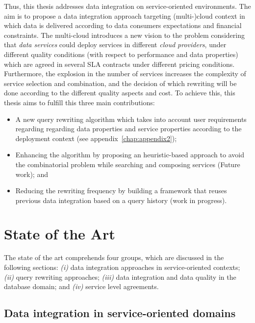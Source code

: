 \bigskip
\noindent Thus, this thesis addresses data integration on service-oriented environments.
%
The aim is to propose a data integration approach targeting (multi-)cloud context in 
which data is delivered according to data consumers expectations and financial constraints.
The multi-cloud introduces a new vision to the problem considering that \textsl{data services} could deploy services in different \textsl{cloud providers}, under different quality conditions (with respect to performance and data properties) which are agreed in several SLA contracts under different pricing conditions. Furthermore, the explosion in the number of services increases the complexity of service selection and combination, and the decision of which rewriting will be done according to the different quality aspects and cost. To achieve this, this thesis aims to fulfill this three main contributions: 
\begin{itemize}
\item A new query rewriting algorithm which takes into account user requirements regarding regarding data properties and service properties according to the deployment context (see appendix~\ref{chap:appendix2});
\item Enhancing the algorithm by proposing an heuristic-based approach to avoid the combinatorial problem while searching and composing services (Future work); and
\item Reducing the rewriting frequency by building a framework that reuses previous data integration based on a query history (work in progress). 
\end{itemize}






\section{State of the Art}
%
The state of the art comprehends four groups, which are discussed in the following sections: 
\textit{(i)} data integration approaches in service-oriented contexts;
\textit{(ii)} query rewriting approaches;
\textit{(iii)} data integration and data quality in the database domain; and \textit{(iv)} service level agreements.

\subsection{Data integration in service-oriented domains}

